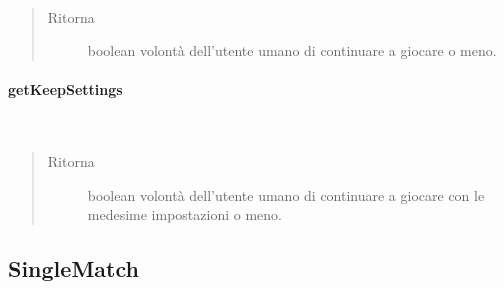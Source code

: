 \documentclass[letterpaper,10pt,italian,openany,oneside]{sphinxmanual}
\begin{document}
\begin{fulllineitems}
\label{\detokenize{source/it/unicam/cs/pa/mastermind/gamecore/NewGameStats:it.unicam.cs.pa.mastermind.gamecore.NewGameStats.getContinue()}}~\begin{quote}\begin{description}
\item[{Ritorna}] \leavevmode
boolean volontà dell’utente umano di continuare a giocare o meno.

\end{description}\end{quote}

\end{fulllineitems}



\paragraph{getKeepSettings}
\label{\detokenize{source/it/unicam/cs/pa/mastermind/gamecore/NewGameStats:getkeepsettings}}

\begin{fulllineitems}
\label{\detokenize{source/it/unicam/cs/pa/mastermind/gamecore/NewGameStats:it.unicam.cs.pa.mastermind.gamecore.NewGameStats.getKeepSettings()}}~\begin{quote}\begin{description}
\item[{Ritorna}] \leavevmode
boolean volontà dell’utente umano di continuare a giocare con le medesime impostazioni o meno.

\end{description}\end{quote}

\end{fulllineitems}



\subsection{SingleMatch}
\label{\detokenize{source/it/unicam/cs/pa/mastermind/gamecore/SingleMatch:singlematch}}\label{\detokenize{source/it/unicam/cs/pa/mastermind/gamecore/SingleMatch::doc}}
\end{document}
